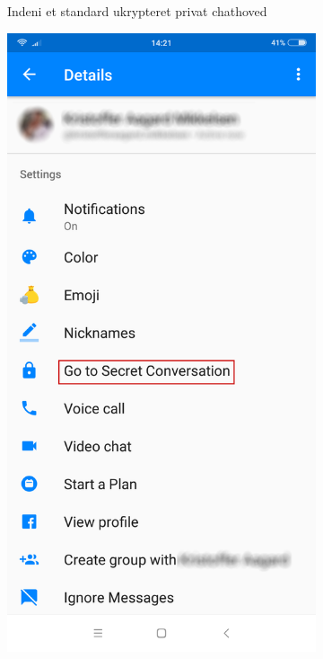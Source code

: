 \begin{figure}[H]
\begin{subfigure}{0.33\textwidth}
        \caption{Indeni et standard ukrypteret privat chathoved}
        \label{fig:facebookchat2}
    \end{subfigure}
    \begin{subfigure}{0.33\textwidth}
        \centering
        \includegraphics[scale=0.15]{Projectdoc/Problemanalyse/Illustrationer/3-fbchat.png} 

\end{subfigure}
\end{figure}
